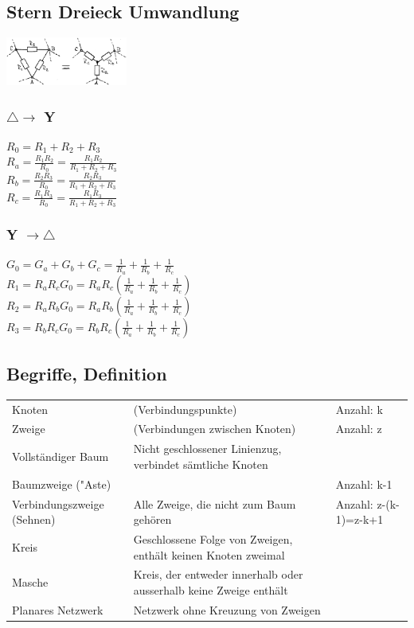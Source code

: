 \subsection{Stern Dreieck Umwandlung}
\begin{multicols}{3}
\includegraphics[width=0.3\textwidth]{pics/stern-dreieck}
\subsubsection{$ \triangle \rightarrow $ Y}
$ R_0 = R_1 + R_2 + R_3 $ \\
$ R_a = \frac{R_1R_2}{R_0} = \frac{R_1R_2}{R_1 + R_2 + R_3} $ \\
$ R_b = \frac{R_2R_3}{R_0} = \frac{R_2R_3}{R_1 + R_2 + R_3} $ \\
$ R_c = \frac{R_1R_3}{R_0} = \frac{R_1R_3}{R_1 + R_2 + R_3} $ \\
\subsubsection{Y $ \rightarrow \triangle $}
$ G_0 = G_a + G_b + G_c = \frac{1}{R_a} + \frac{1}{R_b} + \frac{1}{R_c} $ \\
$ R_1 = R_aR_cG_0 = R_aR_c(\frac{1}{R_a} + \frac{1}{R_b} + \frac{1}{R_c}) $ \\
$ R_2 = R_aR_bG_0 = R_aR_b(\frac{1}{R_a} + \frac{1}{R_b} + \frac{1}{R_c}) $ \\
$ R_3 = R_bR_cG_0 = R_bR_c(\frac{1}{R_a} + \frac{1}{R_b} + \frac{1}{R_c}) $ \\
\end{multicols}

\subsection{Begriffe, Definition}
\begin{tabular}{lll}
Knoten & (Verbindungspunkte) & Anzahl: k \\
Zweige & (Verbindungen zwischen Knoten) & Anzahl: z \\
Vollständiger Baum & Nicht geschlossener Linienzug, verbindet sämtliche Knoten& \\
Baumzweige ("Aste) & &  Anzahl: k-1\\
Verbindungszweige (Sehnen) & Alle Zweige, die nicht zum Baum gehören & Anzahl: z-(k-1)=z-k+1\\
Kreis & Geschlossene Folge von Zweigen, enthält keinen Knoten zweimal & \\
Masche & Kreis, der entweder innerhalb oder ausserhalb keine Zweige enthält & \\
Planares Netzwerk & Netzwerk ohne Kreuzung von Zweigen & \\
\end{tabular}

